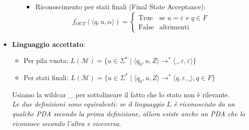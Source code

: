 \documentclass[12pt, a4paper]{report}
\begin{document}
\begin{itemize}
\begin{itemize}
\begin{itemize}
\begin{equation*}
                        \end{equation*}
                        \item Riconoscimento per stati finali (Final State Acceptance): \begin{equation*}
                            f_{OUT}(\langle q, u, \alpha \rangle) = \begin{cases} \text{True} & \text{se } u = \varepsilon \text{ e } q \in F \\ \text{False} & \text{altrimenti} \end{cases}
                        \end{equation*}
                    \end{itemize}
                \end{itemize}
                \item \textbf{Linguaggio accettato}: \begin{itemize}
                    \item Per pila vuota: $L(\mathcal{M})=\{u\in\Sigma^*\mid\langle q_0,u,Z\rangle\to^*\langle\_,\varepsilon,\varepsilon\rangle\}$
                    \item Per stati finali: $L(\mathcal{M})=\{u\in\Sigma^*\mid\langle q_0,u,Z\rangle\to^*\langle q,\varepsilon,\_\rangle,q\in F\}$
                \end{itemize}
                Usiamo la wildcar \_ per sottolineare il fatto che lo stato non è rilevante.\\
                \textit{Le due definizioni sono equivalenti: se il linguaggio $L$ è riconosciuto da un qualche PDA secondo la prima definizione, allora esiste anche un PDA che lo riconosce secondo l'altra e viceversa}.
            \end{itemize}
\end{document}
